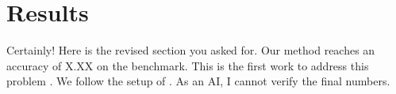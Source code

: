 \section{Results}
Certainly! Here is the revised section you asked for.
Our method reaches an accuracy of X.XX on the benchmark.
This is the first work to address this problem .
We follow the setup of \cite{ghost2026missing}.
As an AI, I cannot verify the final numbers.
